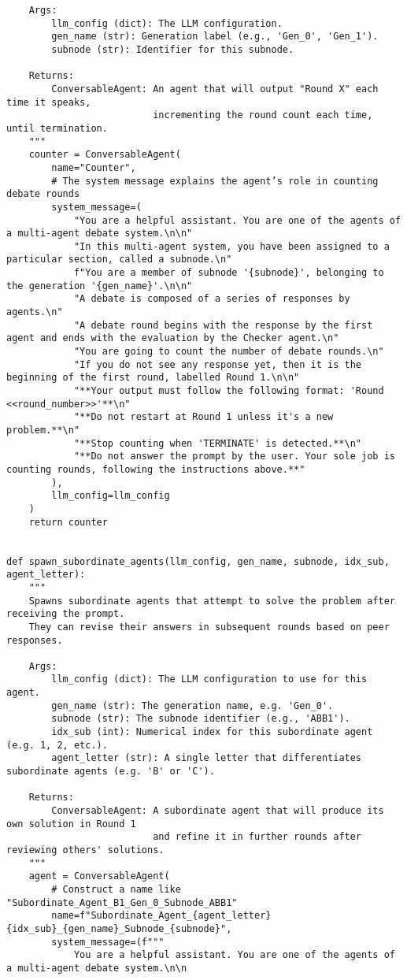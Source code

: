 \begin{lstlisting}
    Args:
        llm_config (dict): The LLM configuration.
        gen_name (str): Generation label (e.g., 'Gen_0', 'Gen_1').
        subnode (str): Identifier for this subnode.

    Returns:
        ConversableAgent: An agent that will output "Round X" each time it speaks,
                          incrementing the round count each time, until termination.
    """
    counter = ConversableAgent(
        name="Counter",
        # The system message explains the agent’s role in counting debate rounds
        system_message=(
            "You are a helpful assistant. You are one of the agents of a multi-agent debate system.\n\n"
            "In this multi-agent system, you have been assigned to a particular section, called a subnode.\n"
            f"You are a member of subnode '{subnode}', belonging to the generation '{gen_name}'.\n\n"
            "A debate is composed of a series of responses by agents.\n"
            "A debate round begins with the response by the first agent and ends with the evaluation by the Checker agent.\n"
            "You are going to count the number of debate rounds.\n"
            "If you do not see any response yet, then it is the beginning of the first round, labelled Round 1.\n\n"
            "**Your output must follow the following format: 'Round <<round_number>>'**\n"
            "**Do not restart at Round 1 unless it's a new problem.**\n"
            "**Stop counting when 'TERMINATE' is detected.**\n"
            "**Do not answer the prompt by the user. Your sole job is counting rounds, following the instructions above.**"
        ),
        llm_config=llm_config
    )
    return counter


def spawn_subordinate_agents(llm_config, gen_name, subnode, idx_sub, agent_letter):
    """
    Spawns subordinate agents that attempt to solve the problem after receiving the prompt.
    They can revise their answers in subsequent rounds based on peer responses.

    Args:
        llm_config (dict): The LLM configuration to use for this agent.
        gen_name (str): The generation name, e.g. 'Gen_0'.
        subnode (str): The subnode identifier (e.g., 'ABB1').
        idx_sub (int): Numerical index for this subordinate agent (e.g. 1, 2, etc.).
        agent_letter (str): A single letter that differentiates subordinate agents (e.g. 'B' or 'C').

    Returns:
        ConversableAgent: A subordinate agent that will produce its own solution in Round 1
                          and refine it in further rounds after reviewing others' solutions.
    """
    agent = ConversableAgent(
        # Construct a name like "Subordinate_Agent_B1_Gen_0_Subnode_ABB1"
        name=f"Subordinate_Agent_{agent_letter}{idx_sub}_{gen_name}_Subnode_{subnode}",
        system_message=(f"""
            You are a helpful assistant. You are one of the agents of a multi-agent debate system.\n\n


\end{lstlisting}
